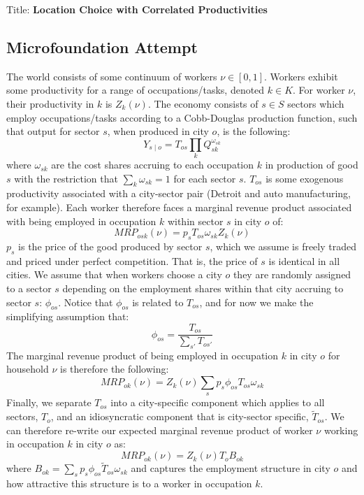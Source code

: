 \documentclass[11pt]{amsart}
\author{}
\begin{document}
Title: \textbf{Location Choice with Correlated Productivities} \\
\subsection{Microfoundation Attempt}
The world consists of some continuum of workers $\nu\in[0,1]$. Workers exhibit some productivity for a range of occupations/tasks, denoted $k\in{K}$. For worker $\nu$, their productivity in $k$ is $Z_{k}(\nu)$. The economy consists of $s\in{S}$ sectors which employ occupations/tasks according to a Cobb-Douglas production function, such that output for sector $s$, when produced in city $o$, is the following:
\begin{equation}
    Y_{s\mid{o}}={T_{os}}\prod\limits_{k}{Q^{\omega_{sk}}_{sk}}
\end{equation}
where $\omega_{sk}$ are the cost shares accruing to each occupation $k$ in production of good $s$ with the restriction that $\sum\limits_{k}{\omega_{sk}}=1$ for each sector $s$. $T_{os}$ is some exogenous productivity associated with a city-sector pair (Detroit and auto manufacturing, for example). Each worker therefore faces a marginal revenue product associated with being employed in occupation $k$ within sector $s$ in city $o$ of:
\begin{equation}
    {MRP}_{osk}(\nu) = {p_{s}}{T_{os}}{\omega_{sk}}{Z_{k}(\nu)}
\end{equation}
$p_{s}$ is the price of the good produced by sector $s$, which we assume is freely traded and priced under perfect competition. That is, the price of $s$ is identical in all cities. We assume that when workers choose a city $o$ they are randomly assigned to a sector $s$ depending on the employment shares within that city accruing to sector $s$: $\phi_{os}$. Notice that $\phi_{os}$ is related to $T_{os}$, and for now we make the simplifying assumption that:
\begin{equation}
    \phi_{os}=\frac{T_{os}}{\sum\limits_{s'}{T_{os'}}}
\end{equation}
The marginal revenue product of being employed in occupation $k$ in city $o$ for household $\nu$ is therefore the following:
\begin{equation}
    {MRP}_{ok}(\nu) = {Z_{k}(\nu)}\sum\limits_{s}{p_{s}}{\phi_{os}}{T_{os}}{\omega_{sk}}
\end{equation}
Finally, we separate $T_{os}$ into a city-specific component which applies to all sectors, $T_{o}$, and an idiosyncratic component that is city-sector specific, $\tilde{T}_{os}$. We can therefore re-write our expected marginal revenue product of worker $\nu$ working in occupation $k$ in city $o$ as:
\begin{equation}
    {MRP}_{ok}(\nu) = {Z_{k}(\nu)}{T_{o}}{B_{ok}}
\end{equation}
where $B_{ok}=\sum\limits_{s}{p_{s}}{\phi_{os}}{\tilde{T}_{os}}{\omega_{sk}}$ and captures the employment structure in city $o$ and how attractive this structure is to a worker in occupation $k$.
\end{document}
